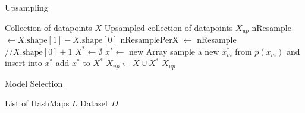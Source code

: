  \begin{algorithm}
    \caption{Upsampling}
    \label{alg:upsampling}
 
    \begin{algorithmic}[1]
        \REQUIRE Collection of datapoints $X$
        \ENSURE Upsampled collection of datapoints $X_{up}$
        \STATE nResample $\leftarrow X.\text{shape}[1] - X.\text{shape}[0]$ 
        \STATE nResamplePerX $\leftarrow$ nResample $// X.\text{shape}[0] + 1$
        \STATE $X^* \leftarrow \emptyset$
            \STATE $x^* \leftarrow$ new Array
                \STATE sample a new $x_m^*$ from $p(x_m)$ and insert into $x^*$
            \ENDFOR
            \STATE add $x^*$ to $X^*$
        \ENDFOR
        \STATE $X_{up} \leftarrow X \cup X^*$
        \RETURN $X_{up}$

    \end{algorithmic}
 \end{algorithm}

 \begin{algorithm}
    \caption{Model Selection}
    \label{alg:model_selection}
 
    \begin{algorithmic}[1]
        \REQUIRE List of HashMaps $L$
        \ENSURE Dataset $D$
    \end{algorithmic}
 \end{algorithm}




